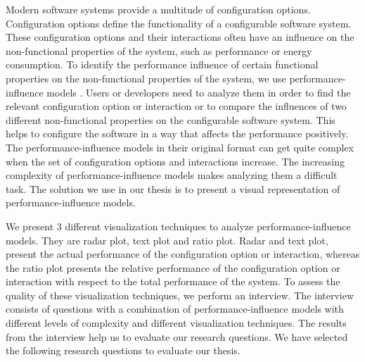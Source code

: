 
Modern software systems provide a multitude of configuration options. Configuration options define the functionality of a configurable software system. These configuration options and their interactions often have an influence on the non-functional properties of the system, such as performance or energy consumption. To identify the performance influence of certain functional properties on the non-functional properties of the system, we use performance-influence models \cite{DBLP:conf/sigsoft/SiegmundGAK15}. 
Users or developers need to analyze them in order to find the relevant configuration option or interaction or to compare the influences of two different non-functional properties on the configurable software system. This helps to configure the software in a way that affects the performance positively. The performance-influence models in their original format can get quite complex when the set of configuration options and interactions increase. The increasing complexity of performance-influence models makes analyzing them a difficult task. The solution we use in our thesis is to present a visual representation of performance-influence models.

We present 3 different visualization techniques to analyze performance-influence models. They are radar plot, text plot and ratio plot. Radar and text plot, present the actual performance of the configuration option or interaction, whereas the ratio plot presents the relative performance of the configuration option or interaction with respect to the total performance of the system. To assess the quality of these visualization techniques, we perform an interview. The interview consists of questions with a combination of performance-influence models with different levels of complexity and different visualization techniques. The results from the interview help us to evaluate our research questions. We have selected the following research questions to evaluate our thesis.

